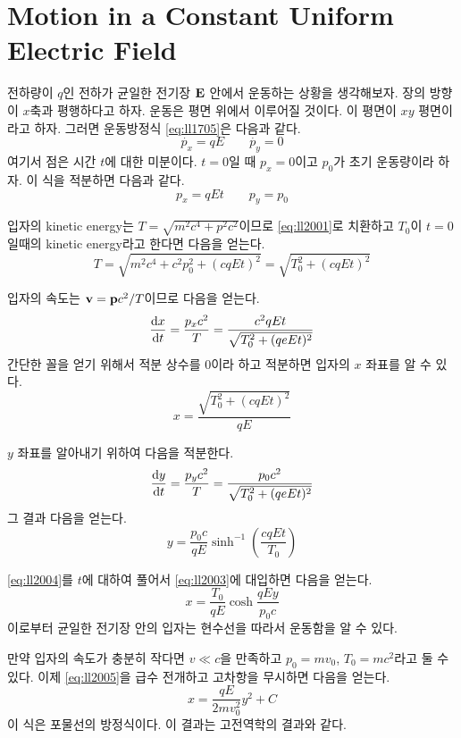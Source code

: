 \section{Motion in a Constant Uniform Electric Field}
\label{sec:05a-06a}

전하량이 $q$인 전하가 균일한 전기장 $\vb{E}$ 안에서 운동하는 상황을 생각해보자. 장의 방향이 $x$축과 평행하다고 하자. 운동은 평면 위에서 이루어질 것이다. 이 평면이 $xy$ 평면이라고 하자.
그러면 운동방정식 \eqref{eq:ll1705}은 다음과 같다.
\begin{equation*}
    \dot{p_x} = q E \qquad \dot{p_y} = 0
\end{equation*}
여기서 점은 시간 $t$에 대한 미분이다.
$t = 0$일 때 $p_x = 0$이고 $p_0$가 초기 운동량이라 하자. 이 식을 적분하면 다음과 같다.
\begin{equation}\label{eq:ll2001}
    p_x = q E t \qquad p_y = p_0
\end{equation}

입자의 kinetic energy는 $T = \sqrt{m^2 c^4 + p^2 c^2}$이므로 \eqref{eq:ll2001}로 치환하고 $T_0$이 $t = 0$일때의 kinetic energy라고 한다면 다음을 얻는다.
\begin{equation}\label{eq:ll2002}
    T = \sqrt{m^2 c^4 + c^2 p_0^2 + (c q E t)^2} = \sqrt{T_0^2 + (c q E t)^2}
\end{equation}

입자의 속도는 $\vb{v} = \vb{p} c^2 / T$이므로 다음을 얻는다.
\begin{equation*}
    \dv{x}{t} = \frac{p_x c^2}{T} = \frac{c^2 q E t}{\sqrt{T_0^2 + (q e E t)^2}}
\end{equation*}
간단한 꼴을 얻기 위해서 적분 상수를 $0$이라 하고 적분하면 입자의 $x$ 좌표를 알 수 있다.
\begin{equation}\label{eq:ll2003}
    x = \frac{\sqrt{T_0^2 + (c q E t)^2}}{q E}
\end{equation}

$y$ 좌표를 알아내기 위하여 다음을 적분한다.
\begin{equation*}
    \dv{y}{t} = \frac{p_y c^2}{T} = \frac{p_0 c^2}{\sqrt{T_0^2 + (q e E t)^2}}
\end{equation*}
그 결과 다음을 얻는다.
\begin{equation}\label{eq:ll2004}
    y = \frac{p_0 c}{q E} \sinh^{-1} \left( \frac{c q E t}{T_0} \right)
\end{equation}

\eqref{eq:ll2004}를 $t$에 대하여 풀어서 \eqref{eq:ll2003}에 대입하면 다음을 얻는다.
\begin{equation}\label{eq:ll2005}
    x = \frac{T_0}{q E} \cosh \frac{q E y}{p_0 c}
\end{equation}
이로부터 균일한 전기장 안의 입자는 현수선을 따라서 운동함을 알 수 있다.

만약 입자의 속도가 충분히 작다면 $v \ll c$을 만족하고 $ p_0 = m v_0 $, $ T_0 = m c^2$라고 둘 수 있다. 이제 \eqref{eq:ll2005}을 급수 전개하고 고차항을 무시하면 다음을 얻는다.
\begin{equation*}
    x = \frac{q E}{2 m v_0^2} y^2 + C
\end{equation*}
이 식은 포물선의 방정식이다. 이 결과는 고전역학의 결과와 같다.
